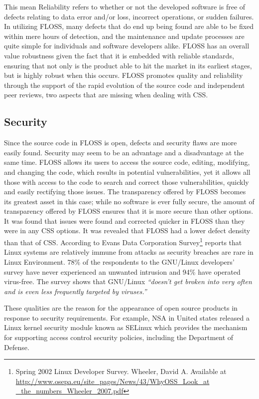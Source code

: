  This mean Reliability refers to whether or not the developed software is free of defects relating to data error and/or loss, incorrect operations, or sudden failures. In utilizing FLOSS, many defects that do end up being found are able to be fixed within mere hours of detection, and the maintenance and update processes are quite simple for individuals and software developers alike. FLOSS has an overall value robustness given the fact that it is embedded with reliable standards, ensuring that not only is the product able to hit the market in its earliest stages, but is highly robust when this occurs. FLOSS promotes quality and reliability through the support of the rapid evolution of the source code and independent peer reviews, two aspects that are missing when dealing with CSS.


 \subsection{Security }
 Since the source code in FLOSS is open, defects and security flaws are more easily found.	Security may seem to be an advantage and a disadvantage at the same time. FLOSS allows its users to access the source code, editing, modifying, and changing the code, which results in potential vulnerabilities, yet it allows all those with access to the code to search and correct those vulnerabilities, quickly and easily rectifying those issues. The transparency offered by FLOSS becomes its greatest asset in this case; while no software is ever fully secure, the amount of transparency offered by FLOSS ensures that it is more secure than other options. It was found that issues were found and corrected quicker in FLOSS than they were in any CSS options. It was revealed that FLOSS had a lower defect density than that of CSS.
 	According to Evans Data Corporation Survey\footnote{Spring 2002 Linux Developer Survey. Wheeler,  David A. Available at \url{http://www.osepa.eu/site\_pages/News/43/WhyOSS\_Look\_at \_the\_numbers\_Wheeler\_2007.pdf}} reports that Linux systems are relatively immune from attacks as security breaches are rare in Linux Environment. 78\% of the respondents to the GNU/Linux developers’ survey have never experienced an unwanted intrusion and 94\% have operated virus-free. The survey shows that GNU/Linux \textit{``doesn’t get broken into very often and is even less frequently targeted by viruses.''}
 	
 	These qualities are the reason for the appearance of open source products in response to security requirements. For example, \ac{NSA} in United states released a Linux kernel security module known as \ac{SELinux} which provides the mechanism for supporting access control security policies, including the Department of Defense.

